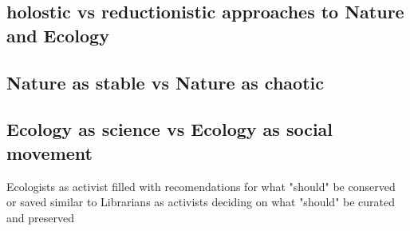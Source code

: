 \cite{tansley_1935}

\subsection{holostic vs reductionistic approaches to Nature and Ecology}

\cite{holling_1998}
\cite{clements_1936}
\cite{gleason_1939}

\subsection{Nature as stable vs Nature as chaotic}

\cite{odum_1953} 
\cite{holling_1973}
\cite{barbour_1996}

\subsection{Ecology as science vs Ecology as social movement}

Ecologists as activist filled with recomendations for what "should" be conserved or saved similar to Librarians as activists deciding on what "should" be curated and preserved

